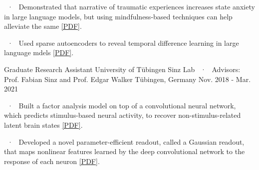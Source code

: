 \begin{cventries}
{\begin{cvitems}
      \item ~·~ Demonstrated that narrative of traumatic experiences increases state anxiety in large language models, but using mindfulness-based techniques can help alleviate the same \href{https://osf.io/j7fwb}{[PDF]}.
      \item ~·~ Used sparse autoencoders to reveal temporal difference learning in large language mdels \href{https://arxiv.org/pdf/2410.01280}{[PDF]}.       
    \end{cvitems}
    }


  \cventryLab
    {Graduate Research Assistant} %
    {University of Tübingen} %
    {Sinz Lab ~·~ Advisors: Prof. Fabian Sinz and Prof. Edgar Walker} %
    {Tübingen, Germany} %
    {Nov. 2018 - Mar. 2021} %
    { %
      \begin{cvitems}
      \item ~·~ Built a factor analysis model on top of a convolutional neural network, which predicts stimulus-based neural activity, to recover non-stimulus-related latent brain states \href{https://proceedings.neurips.cc/paper/2021/file/84a529a92de322be42dd3365afd54f91-Paper.pdf}{[PDF]}. 
      \item ~·~ Developed a novel parameter-efficient readout, called a Gaussian readout, that maps nonlinear features learned by the deep convolutional network to the response of each neuron \href{ https://openreview.net/pdf?id=Tp7kI90Htd}{[PDF]}.
      \end{cvitems}
    }


\end{cventries}
